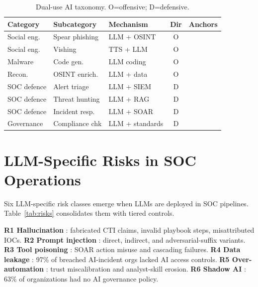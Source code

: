 \documentclass[journal]{IEEEtran}
\begin{document}
\begin{table}[!t]
\renewcommand{\arraystretch}{1.2}
\caption{Dual-use AI taxonomy. O=offensive; D=defensive.}
\label{tab:taxonomy}
\centering
\scriptsize
\begin{tabular}{p{1.4cm}p{1.6cm}p{1.6cm}cp{1.4cm}}
\toprule
\textbf{Category} & \textbf{Subcategory} & \textbf{Mechanism} & \textbf{Dir} & \textbf{Anchors} \\
\midrule
Social eng.   & Spear phishing  & LLM + OSINT     & O & \cite{hazell2023spear} \\
Social eng.   & Vishing         & TTS + LLM       & O & \cite{crowdstrike2025} \\
Malware       & Code gen.       & LLM coding      & O & \cite{bhatt2023cyberseceval} \\
Recon.        & OSINT enrich.   & LLM + data      & O & \cite{hazell2023spear} \\
\addlinespace
SOC defence   & Alert triage    & LLM + SIEM      & D & \cite{llmsoc2025,cortex2025} \\
SOC defence   & Threat hunting  & LLM + RAG       & D & \cite{techniquerag2025} \\
SOC defence   & Incident resp.  & LLM + SOAR      & D & \cite{llmsoc2025} \\
Governance    & Compliance chk  & LLM + standards & D & \cite{owasp2025llm} \\
\bottomrule
\end{tabular}
\end{table}

\section{LLM-Specific Risks in SOC Operations}
\label{sec:risks}

Six LLM-specific risk classes emerge when LLMs are deployed in SOC pipelines.
Table~\ref{tab:risks} consolidates them with tiered controls.

\textbf{R1 Hallucination} \cite{ji2023hallucination}: fabricated CTI claims, invalid
playbook steps, misattributed IOCs. \textbf{R2 Prompt injection}
\cite{liu2024formalizing,greshake2023indirect}: direct, indirect, and adversarial-suffix
variants. \textbf{R3 Tool poisoning} \cite{owasp2025agentic}: SOAR action misuse and
cascading failures. \textbf{R4 Data leakage} \cite{ibm2025costbreach,lgpd2018}: 97\%
of breached AI-incident orgs lacked AI access controls. \textbf{R5 Over-automation}
\cite{llmsoc2025}: trust miscalibration and analyst-skill erosion. \textbf{R6 Shadow AI}
\cite{ibm2025costbreach}: 63\% of organizations had no AI governance policy.
\end{document}
